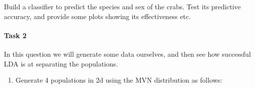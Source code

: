 \documentclass[
]{book}
\newenvironment{Shaded}{\begin{snugshade}}{\end{snugshade}}
\newcommand{\AttributeTok}[1]{\textcolor[rgb]{0.13,0.29,0.53}{#1}}
\newcommand{\FunctionTok}[1]{\textcolor[rgb]{0.13,0.29,0.53}{\textbf{#1}}}
\newcommand{\NormalTok}[1]{#1}
\newcommand{\OtherTok}[1]{\textcolor[rgb]{0.56,0.35,0.01}{#1}}
\newcommand{\SpecialCharTok}[1]{\textcolor[rgb]{0.81,0.36,0.00}{\textbf{#1}}}
\newcommand{\StringTok}[1]{\textcolor[rgb]{0.31,0.60,0.02}{#1}}
\providecommand{\tightlist}{%
  \setlength{\itemsep}{0pt}\setlength{\parskip}{0pt}}
\theoremstyle{definition}
\theoremstyle{definition}
\theoremstyle{definition}
\theoremstyle{definition}
\theoremstyle{remark}
\begin{document}
\begin{Shaded}
\end{Shaded}

Build a classifier to predict the species and sex of the crabs. Test its predictive accuracy, and provide some plots showing its effectiveness etc.

\paragraph*{Task 2}\label{task-2-3}

In this question we will generate some data ourselves, and then see how successful LDA is at separating the populations.

\begin{enumerate}
\def\labelenumi{\roman{enumi}.}
\tightlist
\item
  Generate 4 populations in 2d using the MVN distribution as follows:
\end{enumerate}
\end{document}
